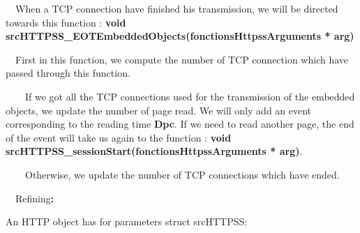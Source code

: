 \documentclass[a4paper]{article}
\begin{document}
\bigskip

{
\ \ When a TCP connection have finished his transmission, we will be
directed towards this function : \textbf{void
srcHTTPSS\_EOTEmbeddedObjects(fonctionsHttpssArguments * arg)}}

{
\ \ First in this function, we compute the number of TCP connection
which have passed through this function.}

{
\ \ \ \ If we got all the TCP connections used for the transmission of
the embedded objects, we update the number of page read. We will only
add an event corresponding to the reading time \textbf{Dpc}. If we need
to read another page, the end of the event will take us again to the
function : \textbf{void
srcHTTPSS\_sessionStart(fonctionsHttpssArguments * arg)}.}


\bigskip

{
\ \ \ \ Otherwise, we update the number of TCP connections which have
ended.}

\clearpage\clearpage\setcounter{page}{1}\pagestyle{Standard}
{
\ \ Refining\textbf{:}}


\bigskip

{
An HTTP object has for parameters struct srcHTTPSS:}
\end{document}
